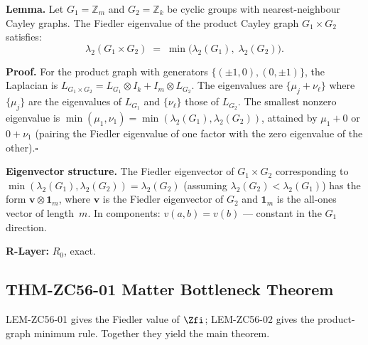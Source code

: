 \documentclass[12pt, a4paper]{article}
\begin{document}
\begin{formalbox}[title={LEM-ZC56-02: $\lambda_2(G_1\times G_2)
  = \min(\lambda_2(G_1),\lambda_2(G_2))$ for Cyclic Groups
  ($R_0$, Exact)}]
\textbf{Lemma.}
Let $G_1=\mathbb{Z}_m$ and $G_2=\mathbb{Z}_k$ be cyclic groups
with nearest-neighbour Cayley graphs.  The Fiedler eigenvalue of
the product Cayley graph $G_1\times G_2$ satisfies:
\begin{equation}
  \lambda_2(G_1\times G_2)
  \;=\; \min\!\bigl(\lambda_2(G_1),\;\lambda_2(G_2)\bigr).
  \label{eq:product-min}
\end{equation}

\textbf{Proof.}
For the product graph with generators
$\{(\pm1,0),(0,\pm1)\}$, the Laplacian is
$L_{G_1\times G_2} = L_{G_1}\otimes I_{k} + I_{m}\otimes L_{G_2}$.
The eigenvalues are $\{\mu_j + \nu_\ell\}$ where $\{\mu_j\}$ are
the eigenvalues of $L_{G_1}$ and $\{\nu_\ell\}$ those of $L_{G_2}$.
The smallest nonzero eigenvalue is
$\min(\mu_1, \nu_1) = \min(\lambda_2(G_1), \lambda_2(G_2))$,
attained by $\mu_1+0$ or $0+\nu_1$
(pairing the Fiedler eigenvalue of one factor with the zero
eigenvalue of the other).\hfill$\square$

\medskip
\textbf{Eigenvector structure.}
The Fiedler eigenvector of $G_1\times G_2$ corresponding to
$\min(\lambda_2(G_1),\lambda_2(G_2))=\lambda_2(G_2)$ (assuming
$\lambda_2(G_2)<\lambda_2(G_1)$) has the form
$\mathbf{v}\otimes\mathbf{1}_{m}$,
where $\mathbf{v}$ is the Fiedler eigenvector of $G_2$ and
$\mathbf{1}_m$ is the all-ones vector of length~$m$.
In components: $v(a,b)=v(b)$ --- constant in the $G_1$ direction.

\textbf{R-Layer:} $R_0$, exact.
\end{formalbox}

\subsection{THM-ZC56-01 \quad Matter Bottleneck Theorem}
\label{sec:thm01}

LEM-ZC56-01 gives the Fiedler value of $\Zfi$; LEM-ZC56-02
gives the product-graph minimum rule.  Together they yield the
main theorem.

\end{document}
